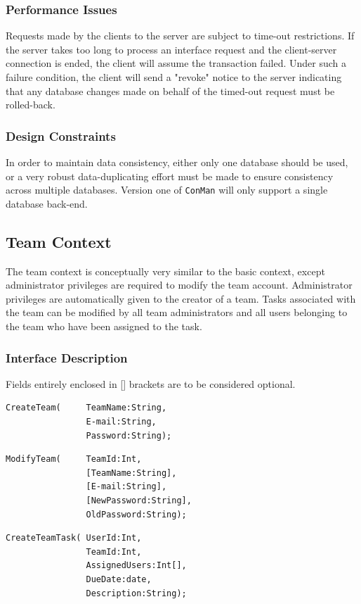 \documentclass{article}
\begin{document}
\subsubsection{Performance Issues}
Requests made by the clients to the server are subject to time-out restrictions.  
If the server takes too long to process an interface request and the client-server connection is ended, the client will assume the transaction failed.
Under such a failure condition, the client will send a "revoke" notice to the server indicating that any database changes made on behalf of the timed-out request must be rolled-back.
\subsubsection{Design Constraints}
In order to maintain data consistency, either only one database should be used, or a very robust data-duplicating effort must be made to ensure consistency across multiple databases.  
Version one of \texttt{ConMan} will only support a single database back-end.

\subsection{Team Context}
The team context is conceptually very similar to the basic context, except administrator privileges are required to modify the team account.
Administrator privileges are automatically given to the creator of a team.
Tasks associated with the team can be modified by all team administrators and all users belonging to the team who have been assigned to the task.

\subsubsection{Interface Description}
Fields entirely enclosed in [] brackets are to be considered optional.
\begin{lstlisting}
CreateTeam(     TeamName:String,
                E-mail:String,
                Password:String);
\end{lstlisting}

\begin{lstlisting}
ModifyTeam(     TeamId:Int,
                [TeamName:String],
                [E-mail:String],
                [NewPassword:String],
                OldPassword:String);
\end{lstlisting}

\begin{lstlisting}
CreateTeamTask( UserId:Int,
                TeamId:Int,
                AssignedUsers:Int[],
                DueDate:date,
                Description:String);
\end{lstlisting}
\end{document}
